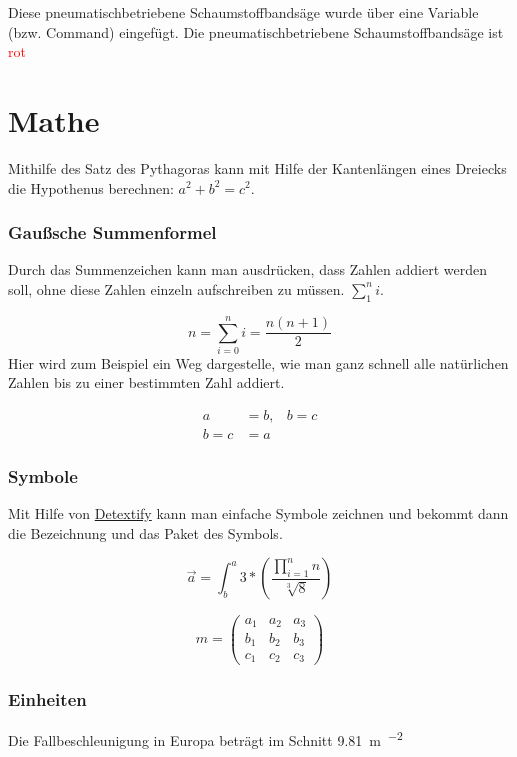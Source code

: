 \documentclass{article}
\newcommand{\pbsb}{pneumatischbetriebene Schaumstoffbandsäge}
\newcommand\rot[1]{\textcolor{red}{#1}}
\begin{document}
Diese \pbsb{} wurde über eine Variable (bzw. Command) eingefügt.
Die \pbsb{} ist \rot{rot}

\part*{Mathe}

Mithilfe des Satz des Pythagoras kann mit Hilfe der Kantenlängen eines Dreiecks die Hypothenus berechnen:
$a^2 + b^2 = c^2$.
\section*{Gaußsche Summenformel}
Durch das Summenzeichen kann man ausdrücken, dass Zahlen addiert werden soll, ohne diese Zahlen einzeln aufschreiben zu müssen.
\( \sum^n_1 i \).

\begin{displaymath}
    n = \sum^n_{i=0} i = \frac{n(n+1)}{2}
\end{displaymath}
Hier wird zum Beispiel ein Weg dargestelle, wie man ganz schnell alle natürlichen Zahlen bis zu einer bestimmten Zahl addiert.


\begin{align}
    a     & = b, & b = c \\
    b = c & = a
\end{align}

\section*{Symbole}
Mit Hilfe von \href{https://detexify.kirelabs.org/classify.html}{Detextify}
kann man einfache Symbole zeichnen und bekommt dann die Bezeichnung und das Paket des Symbols.

\begin{displaymath}
    \vec a =
    \int^{a}_{b}
    { 3 * \left(
        \frac{\prod^{n}_{i=1}{n}}{\sqrt[3]{8}}
    \right) }
\end{displaymath}

\[ m = \left(
    \begin{matrix}

            a_1 & a_2 & a_3 \\
            b_1 & b_2 & b_3 \\
            c_1 & c_2 & c_3
        \end{matrix}
    \right)
\]

\section*{Einheiten}
Die Fallbeschleunigung in Europa beträgt im Schnitt
\SI[per-mode=symbol]{9.81}{\metre\per\sec^{2}}
\end{document}
